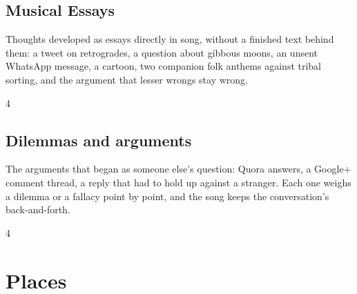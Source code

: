 \documentclass[a4paper,landscape]{memoir}
\begin{document}
\chapter{Musical Essays}
Thoughts developed as essays directly in song, without a finished text behind them: a tweet on retrogrades, a question about gibbous moons, an unsent WhatsApp message, a cartoon, two companion folk anthems against tribal sorting, and the argument that lesser wrongs stay wrong.
\clearpage\begin{multicols*}{4}









\end{multicols*}

\chapter{Dilemmas and arguments}
The arguments that began as someone else's question: Quora answers, a Google+ comment thread, a reply that had to hold up against a stranger. Each one weighs a dilemma or a fallacy point by point, and the song keeps the conversation's back-and-forth.
\clearpage\begin{multicols*}{4}











\end{multicols*}

\part{Places}
\end{document}
